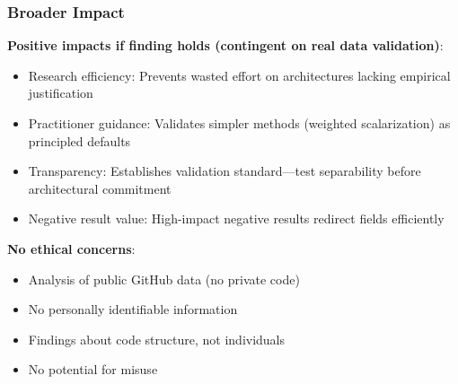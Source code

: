 \subsubsection{Broader Impact}

\textbf{Positive impacts if finding holds (contingent on real data validation)}:
\begin{itemize}
\item Research efficiency: Prevents wasted effort on architectures lacking empirical justification
\item Practitioner guidance: Validates simpler methods (weighted scalarization) as principled defaults
\item Transparency: Establishes validation standard—test separability before architectural commitment
\item Negative result value: High-impact negative results redirect fields efficiently
\end{itemize}

\textbf{No ethical concerns}:
\begin{itemize}
\item Analysis of public GitHub data (no private code)
\item No personally identifiable information
\item Findings about code structure, not individuals
\item No potential for misuse
\end{itemize}

